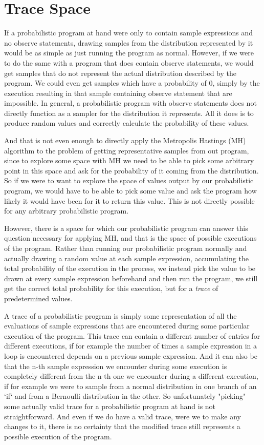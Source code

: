\section{Trace Space}

If a probabilistic program at hand were only to contain sample expressions and no observe statements, drawing samples from the distribution represented by it would be as simple as just running the program as normal. However, if we were to do the same with a program that does contain observe statements, we would get samples that do not represent the actual distribution described by the program. We could even get samples which have a probability of $0$, simply by the execution resulting in that sample containing observe statement that are impossible. In general, a probabilistic program with observe statements does not directly function as a sampler for the distribution it represents. All it does is to produce random values and correctly calculate the probability of these values.

And that is not even enough to directly apply the Metropolis Hastings (MH) algorithm to the problem of getting representative samples from out program, since to explore some space with MH we need to be able to pick some arbitrary point in this space and ask for the probability of it coming from the distribution. So if we were to want to explore the space of values output by our probabilistic program, we would have to be able to pick some value and ask the program how likely it would have been for it to return this value. This is not directly possible for any arbitrary probabilistic program.

However, there is a space for which our probabilistic program can answer this question necessary for applying MH, and that is the space of possible executions of the program. Rather than running our probabilistic program normally and actually drawing a random value at each sample expression, accumulating the total probability of the execution in the process, we instead pick the value to be drawn at every sample expression beforehand and then run the program, we still get the correct total probability for this execution, but for a \textit{trace} of predetermined values.

A trace of a probabilistic program is simply some representation of all the evaluations of sample expressions that are encountered during some particular execution of the program. This trace can contain a different number of entries for different executions, if for example the number of times a sample expression in a loop is encountered depends on a previous sample expression. And it can also be that the n-th sample expression we encounter during some execution is completely different from the n-th one we encounter during a different execution, if for example we were to sample from a normal distribution in one branch of an `if` and from a Bernoulli distribution in the other. So unfortunately "picking" some actually valid trace for a probabilistic program at hand is not straightforward. And even if we do have a valid trace, were we to make any changes to it, there is no certainty that the modified trace still represents a possible execution of the program.

